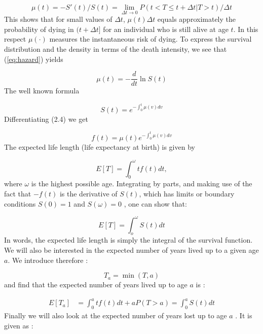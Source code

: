 \begin{equation}
\label{eq:hazard}
\mu(t) = - S'(t)/S(t) = \displaystyle {\lim_{\Delta t \to 0} P(t<T\leq{t+\Delta t | T>t})/ \Delta t}    
\end{equation}
This shows that for small values of 
$\Delta t$, $ \mu(t) \Delta t $ 
equals approximately the probability of dying in $ (t+\Delta t] $ for an individual who is still alive at age $t$. In this respect
$\mu( \cdot )$
measures the instantaneous risk of dying.
To express the survival distribution and the density in terms of the death intensity, we see that (\ref{eq:hazard}) yields

\begin{equation*}
    \mu( t ) = - \frac{d}{dt}\ln{S(t)}
\end{equation*}
The well known formula

\begin{equation}
  S(t) = e^{-\int_{0}^{t} \mu(v)d v }
\end{equation}
Differentiating (2.4) we get

\begin{equation}
    f(t) = \mu(t) e^{-\int_{0}^{t} \mu(v)d v }
\end{equation}
The expected life length (life expectancy at birth) is given by


\begin{equation}
    E[T] = \int_{0}^{\omega}tf(t)dt, 
\end{equation}
where $\omega$ is the highest possible age.
Integrating by parts, and making use of the fact that $-f(t)$ is the derivative of $S(t)$, which has limits or boundary conditions $S(0)=1$ and $S(\omega)=0$ , one can show that: 


\begin{equation}
    E[T] = \int_{o}^{\omega}S(t)dt
    \label{life length and survival}
\end{equation}
In words, the expected life length is simply the integral of the survival function. 
We will also be interested in the expected number of years lived up to a given age $a$. 
We introduce therefore : 

\begin{equation*}
 T_{a} = \min (T,a)   
\end{equation*}
and find that the expected number of years lived up to age $a$ is :


\begin{align*}
    E[T_{a}] &= \int_{0}^{a}tf(t)dt + a P( T > a )
             = \int_{0}^a S(t)dt
\end{align*}
Finally we will also look at the expected number of years lost up to age $a$ . It is given as :

